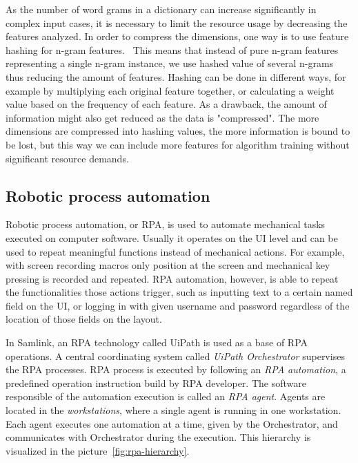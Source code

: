 As the number of word grams in a dictionary can increase significantly
in complex input cases,
it is necessary to limit the resource usage by decreasing the features analyzed.
In order to compress the dimensions,
one way is to use feature hashing for n-gram features.~\cite{azure2021fhash}
This means that instead of pure n-gram features representing a single n-gram instance,
we use hashed value of several n-grams
thus reducing the amount of features.
Hashing can be done in different ways,
for example by multiplying each original feature together,
or calculating a weight value based on the frequency of each feature.
As a drawback,
the amount of information might also get reduced as the data is "compressed".
The more dimensions are compressed into hashing values,
the more information is bound to be lost,
but this way we can include more features for algorithm training
without significant resource demands.~\cite{caragea2012protein,shi2009hash}


\subsection{Robotic process automation}\label{subsec:bg-rpa}

Robotic process automation, or RPA,
is used to automate mechanical tasks executed on computer software.
Usually it operates on the UI level
and can be used to repeat meaningful functions
instead of mechanical actions.
For example, with screen recording macros
only position at the screen and mechanical key pressing is recorded and repeated.
RPA automation, however,
is able to repeat the functionalities those actions trigger,
such as inputting text to a certain named field on the UI,
or logging in with given username and password
regardless of the location of those fields on the layout.~\cite{tripathi2018learning}

In Samlink,
an RPA technology called UiPath is used as a base of RPA operations.
A central coordinating system called \textit{UiPath Orchestrator}
supervises the RPA processes.
RPA process is executed by following
an \textit{RPA automation},
a predefined operation instruction build by RPA developer.
The software responsible of the automation execution
is called an \textit{RPA agent}.
Agents are located in the \textit{workstations},
where a single agent is running in one workstation.
Each agent executes one automation at a time,
given by the Orchestrator,
and communicates with Orchestrator during the execution.
This hierarchy is visualized in the picture~\ref{fig:rpa-hierarchy}.

